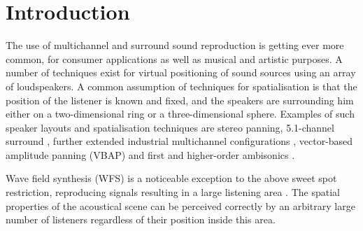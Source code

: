 \documentclass[twoside,10pt]{article}
\title{\papertitle}
\begin{document}
    
\maketitle




%
%




\begin{abstract}
The abstract should be placed at the top left column and should contain
about 150 words.
\end{abstract}








%
%


\section{Introduction}\label{sec:introduction}

The use of multichannel and surround sound reproduction is getting ever more common, for consumer applications as well as musical and artistic purposes. A number of techniques exist for virtual positioning of sound sources using an array of loudspeakers. A common assumption of techniques for spatialisation is that the position of the listener is known and fixed, and the speakers are surrounding him either on a two-dimensional ring or a three-dimensional sphere. Examples of such speaker layouts and spatialisation techniques are stereo panning, 5.1-channel surround \cite{ITU:1993_surround_5:1}, further extended industrial multichannel configurations \cite{Rumsey:2001spatial_audio}, vector-based amplitude panning (VBAP) \cite{Pulkki:1997vbap} and first and higher-order ambisonics \cite{Gerzon:1974surround, Poletti:2000holographic_sound}.

Wave field synthesis (WFS) is a noticeable exception to the above sweet spot restriction, reproducing signals resulting in a large listening area \cite{Spors:2004sound_field_synthesis}. The spatial properties of the acoustical scene can be perceived correctly by an arbitrary large number of listeners regardless of their position inside this area.
\end{document}

